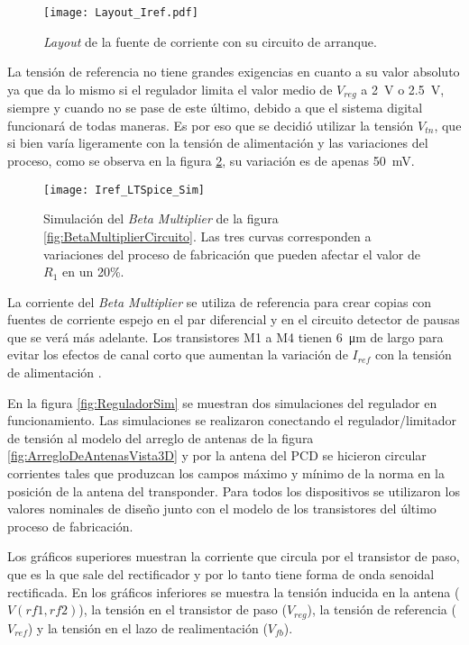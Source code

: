 \begin{figure}
	\centering
	\texttt{[image: Layout\_Iref.pdf]}
	\caption{\emph{Layout} de la fuente de corriente con su circuito 
	de arranque.}
	\label{fig:BetaMultiplierLayout}
\end{figure}

La tensión de referencia no tiene grandes exigencias en 
cuanto a su valor absoluto ya que da lo mismo si el regulador limita 
el valor medio de \(V_{reg}\) a \SI{2}{\volt} o \SI{2.5}{\volt}, 
siempre y cuando no se pase de este último, debido a que el sistema 
digital funcionará de todas maneras. Es por eso que se decidió 
utilizar la tensión \(V_{tn}\), que si bien varía ligeramente con la 
tensión de alimentación y las variaciones del proceso, como se 
observa en la figura \ref{fig:BetaMultiplierSim}, su variación es de 
apenas \SI{50}{\milli\volt}.

\begin{figure}
	\centering
	\texttt{[image: Iref\_LTSpice\_Sim]}
	\caption{Simulación del \emph{Beta Multiplier} de la figura 
	\ref{fig:BetaMultiplierCircuito}. Las tres curvas corresponden a 
	variaciones del proceso de fabricación que pueden afectar el valor
	de \(R_{1}\) en un 20\%.}
	\label{fig:BetaMultiplierSim}
\end{figure}

La corriente del \emph{Beta Multiplier} se utiliza de referencia para 
crear copias con fuentes de corriente espejo en el par diferencial y 
en el circuito detector de pausas que se verá más adelante. Los 
transistores M1 a M4 tienen \SI{6}{\micro\meter} de largo para evitar 
los efectos de canal corto que aumentan la variación de \(I_{ref}\) 
con la tensión de alimentación \cite{Baker}.

\bigskip
En la figura \ref{fig:ReguladorSim} se muestran dos simulaciones del 
regulador en funcionamiento. Las simulaciones se realizaron 
conectando el regulador/limitador de tensión al modelo del arreglo 
de antenas de la figura \ref{fig:ArregloDeAntenasVista3D} y por la 
antena del PCD se hicieron circular corrientes tales que produzcan 
los campos máximo y mínimo de la norma en la posición de la antena 
del transponder. Para todos los dispositivos se utilizaron los valores 
nominales de diseño junto con el modelo de los transistores del
último proceso de fabricación.

Los gráficos superiores muestran la corriente que 
circula por el transistor de paso, que es la que sale del 
rectificador y por lo tanto tiene forma de onda senoidal rectificada. 
En los gráficos inferiores se muestra la tensión inducida en la antena 
(\(V(rf1,rf2)\)), la tensión en el transistor de paso (\(V_{reg}\)), 
la tensión de referencia (\(V_{ref}\)) y la tensión en el lazo de 
realimentación (\(V_{fb}\)).


